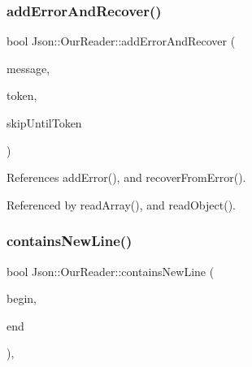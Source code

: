 \subsubsection{\texorpdfstring{add\+Error\+And\+Recover()}{addErrorAndRecover()}}
{\footnotesize\ttfamily bool Json\+::\+Our\+Reader\+::add\+Error\+And\+Recover (\begin{DoxyParamCaption}\item[{const \hyperlink{json_8h_a1e723f95759de062585bc4a8fd3fa4be_a1e723f95759de062585bc4a8fd3fa4be}{J\+S\+O\+N\+C\+P\+P\+\_\+\+S\+T\+R\+I\+NG} \&}]{message,  }\item[{\hyperlink{classJson_1_1OurReader_1_1Token}{Token} \&}]{token,  }\item[{\hyperlink{classJson_1_1OurReader_a15116f7276ddf1e7a2cc3cbefa884dcc_a15116f7276ddf1e7a2cc3cbefa884dcc}{Token\+Type}}]{skip\+Until\+Token }\end{DoxyParamCaption})\hspace{0.3cm}{\ttfamily [private]}}



References add\+Error(), and recover\+From\+Error().



Referenced by read\+Array(), and read\+Object().

\mbox{\label{classJson_1_1OurReader_ab9e83f5a3d9dab2dabce367a4faa2b1b_ab9e83f5a3d9dab2dabce367a4faa2b1b}} 
\subsubsection{\texorpdfstring{contains\+New\+Line()}{containsNewLine()}}
{\footnotesize\ttfamily bool Json\+::\+Our\+Reader\+::contains\+New\+Line (\begin{DoxyParamCaption}\item[{\hyperlink{classJson_1_1OurReader_a1bdc7bbc52ba87cae6b19746f2ee0189_a1bdc7bbc52ba87cae6b19746f2ee0189}{Our\+Reader\+::\+Location}}]{begin,  }\item[{\hyperlink{classJson_1_1OurReader_a1bdc7bbc52ba87cae6b19746f2ee0189_a1bdc7bbc52ba87cae6b19746f2ee0189}{Our\+Reader\+::\+Location}}]{end }\end{DoxyParamCaption})\hspace{0.3cm}{\ttfamily [static]}, {\ttfamily [private]}}



